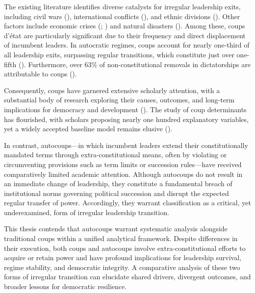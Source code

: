 \documentclass[
  12pt,
]{report}
\begin{document}
The existing literature identifies diverse catalysts for irregular
leadership exits, including civil wars
(), international
conflicts (),
and ethnic divisions (). Other factors include economic crises
(;
) and natural
disasters (). Among these, coups d'état are particularly significant due to
their frequency and direct displacement of incumbent leaders. In
autocratic regimes, coups account for nearly one-third of all leadership
exits, surpassing regular transitions, which constitute just over
one-fifth ().
Furthermore, over \(63\%\) of non-constitutional removals in
dictatorships are attributable to coups
().

Consequently, coups have garnered extensive scholarly attention, with a
substantial body of research exploring their causes, outcomes, and
long-term implications for democracy and development
(). The study of coup
determinants has flourished, with scholars proposing nearly one hundred
explanatory variables, yet a widely accepted baseline model remains
elusive ().

In contrast, autocoups---in which incumbent leaders extend their
constitutionally mandated terms through extra-constitutional means,
often by violating or circumventing provisions such as term limits or
succession rules---have received comparatively limited academic
attention. Although autocoups do not result in an immediate change of
leadership, they constitute a fundamental breach of institutional norms
governing political succession and disrupt the expected regular transfer
of power. Accordingly, they warrant classification as a critical, yet
underexamined, form of irregular leadership transition.

This thesis contends that autocoups warrant systematic analysis
alongside traditional coups within a unified analytical framework.
Despite differences in their execution, both coups and autocoups involve
extra-constitutional efforts to acquire or retain power and have
profound implications for leadership survival, regime stability, and
democratic integrity. A comparative analysis of these two forms of
irregular transition can elucidate shared drivers, divergent outcomes,
and broader lessons for democratic resilience.
\end{document}
